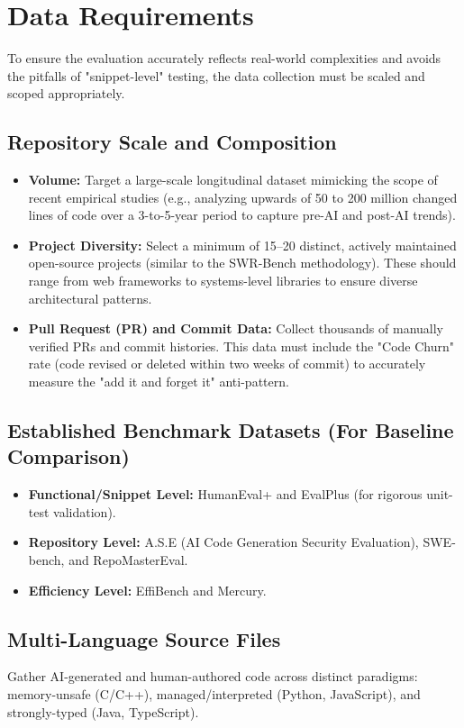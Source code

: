 \section{Data Requirements}
To ensure the evaluation accurately reflects real-world complexities and avoids the pitfalls of "snippet-level" testing, the data collection must be scaled and scoped appropriately.

\subsection{Repository Scale and Composition}
\begin{itemize}
    \item \textbf{Volume:} Target a large-scale longitudinal dataset mimicking the scope of recent empirical studies (e.g., analyzing upwards of 50 to 200 million changed lines of code over a 3-to-5-year period to capture pre-AI and post-AI trends).
    \item \textbf{Project Diversity:} Select a minimum of 15--20 distinct, actively maintained open-source projects (similar to the SWR-Bench methodology). These should range from web frameworks to systems-level libraries to ensure diverse architectural patterns.
    \item \textbf{Pull Request (PR) and Commit Data:} Collect thousands of manually verified PRs and commit histories. This data must include the "Code Churn" rate (code revised or deleted within two weeks of commit) to accurately measure the "add it and forget it" anti-pattern.
\end{itemize}

\subsection{Established Benchmark Datasets (For Baseline Comparison)}
\begin{itemize}
    \item \textbf{Functional/Snippet Level:} HumanEval+ and EvalPlus (for rigorous unit-test validation).
    \item \textbf{Repository Level:} A.S.E (AI Code Generation Security Evaluation), SWE-bench, and RepoMasterEval.
    \item \textbf{Efficiency Level:} EffiBench and Mercury.
\end{itemize}

\subsection{Multi-Language Source Files}
Gather AI-generated and human-authored code across distinct paradigms: memory-unsafe (C/C++), managed/interpreted (Python, JavaScript), and strongly-typed (Java, TypeScript).

